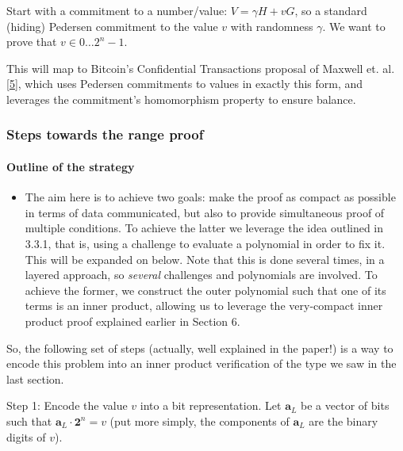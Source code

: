\documentclass[10pt,a4paper]{article}
\providecommand{\tightlist}{%
  \setlength{\itemsep}{0pt}\setlength{\parskip}{0pt}}
\begin{document}
Start with a commitment to a number/value: $V = \gamma H + vG$, so a standard (hiding)
Pedersen commitment to the value $v$ with randomness $\gamma$. We want to prove that
$v \in {0 \ldots 2^n - 1}$.

This will map to Bitcoin's Confidential Transactions proposal of Maxwell
et. al. {[}\protect\hyperlink{anchor-2}{5}{]}, which uses Pedersen
commitments to values in exactly this form, and leverages the
commitment's homomorphism property to ensure balance.

\hypertarget{steps-towards-the-range-proof}{%
\subsubsection[Steps towards the range
proof]{\texorpdfstring{\protect\hypertarget{anchor-54}{}{}Steps towards
the range
proof}{Steps towards the range proof}}\label{steps-towards-the-range-proof}}

\hypertarget{outline-of-the-strategy}{%
\paragraph[Outline of the
strategy]{\texorpdfstring{\protect\hypertarget{anchor-55}{}{}Outline of
the strategy}{Outline of the strategy}}\label{outline-of-the-strategy}}

\begin{itemize}
\tightlist
\item
  The aim here is to achieve two goals: make the proof as compact as
  possible in terms of data communicated, but also to provide
  simultaneous proof of multiple conditions. To achieve the latter we
  leverage the idea outlined in 3.3.1, that is, using a challenge to
  evaluate a polynomial in order to fix it. This will be expanded on
  below. Note that this is done several times, in a layered approach, so
  \emph{several} challenges and polynomials are involved. To achieve the
  former, we construct the outer polynomial such that one of its terms
  is an inner product, allowing us to leverage the very-compact inner
  product proof explained earlier in Section 6.
\end{itemize}

So, the following set of steps (actually, well explained in the paper!)
is a way to encode this problem into an inner product verification of
the type we saw in the last section.

Step 1: Encode the value $v$ into a bit representation. Let $\mathbf{a}_L$ be a vector of
bits such that $\textbf{a}_L \cdot \textbf{2}^n = v$ (put more simply, the components of $\mathbf{a}_L$ are the binary digits of $v$).
\end{document}
